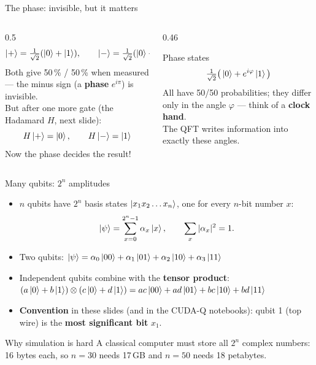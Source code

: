 \documentclass[aspectratio=169,11pt]{beamer}
\newcommand{\hl}[1]{{\color{qorange}\textbf{#1}}}
\newcommand{\key}[1]{{\color{qdark}\textbf{#1}}}
\begin{document}
\begin{frame}{The phase: invisible, but it matters}
  \begin{columns}[T]
    \begin{column}{0.5\textwidth}
      \[ \ket{+} = \tfrac{1}{\sqrt2}(\ket{0} + \ket{1}), \qquad \ket{-} = \tfrac{1}{\sqrt2}(\ket{0} - \ket{1}) \]
      Both give 50\,\% / 50\,\% when measured --- the minus sign (a \key{phase} $e^{i\pi}$) is invisible.\\[2mm]
      But after one more gate (the Hadamard $H$, next slide):
      \[ H\ket{+} = \ket{0}, \qquad H\ket{-} = \ket{1} \]
      Now the phase decides the result!
    \end{column}
    \begin{column}{0.46\textwidth}
      \begin{block}{Phase states}
        \[ \tfrac{1}{\sqrt2}\big(\ket{0} + e^{i\varphi}\ket{1}\big) \]
        All have 50/50 probabilities; they differ only in the angle $\varphi$ --- think of a \hl{clock hand}.\\[2mm]
        The QFT writes information into exactly these angles.
      \end{block}
    \end{column}
  \end{columns}
\end{frame}

\begin{frame}{Many qubits: $2^n$ amplitudes}
  \begin{itemize}
    \item $n$ qubits have $2^n$ basis states $\ket{x_1x_2\dots x_n}$, one for every $n$-bit number $x$:
      \[ \ket{\psi} = \sum_{x=0}^{2^n-1} \alpha_x \ket{x}, \qquad \sum_x |\alpha_x|^2 = 1 . \]
    \item Two qubits: $\ket{\psi} = \alpha_0\ket{00} + \alpha_1\ket{01} + \alpha_2\ket{10} + \alpha_3\ket{11}$
    \item Independent qubits combine with the \key{tensor product}: $(a\ket0 + b\ket1)\otimes(c\ket0 + d\ket1)
      = ac\ket{00} + ad\ket{01} + bc\ket{10} + bd\ket{11}$
    \item \key{Convention} in these slides (and in the CUDA-Q notebooks): qubit 1 (top wire) is the
      \hl{most significant bit} $x_1$.
  \end{itemize}
  \begin{alertblock}{Why simulation is hard}
    A classical computer must store all $2^n$ complex numbers: 16 bytes each, so $n = 30$ needs 17\,GB and $n = 50$
    needs 18 petabytes.
  \end{alertblock}
\end{frame}
\end{document}

